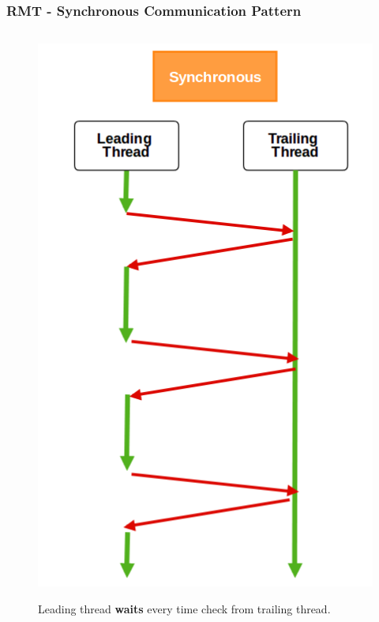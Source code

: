 \documentclass[xcolor=pdftex,dvipsnames,table]{beamer}
\begin{document}
\begin{frame}
	\frametitle{RMT - Synchronous Communication Pattern}  
    
	\begin{columns}[c]
		\column{2in}
         	\begin{figure}[H]
            	\captionsetup{labelformat=empty,labelsep=none}
         		\begin{center} \includegraphics[scale=0.27]{Pattern-Sync.png} \end{center}
                Leading thread \textbf{waits} every time check from trailing thread. 
     		\end{figure}
            

\end{columns}
\end{frame}
\end{document}

